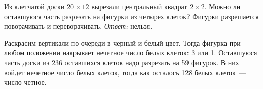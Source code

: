 \problem{}
Из клетчатой доски $20 \times 12$ вырезали центральный квадрат $2 \times 2$.
Можно ли оставшуюся часть разрезать на фигурки
из четырех клеток?
Фигурки разрешается поворачивать и переворачивать.
\solution
\emph{Ответ:} нельзя.
\par
Раскрасим вертикали по очереди в черный и белый цвет.
Тогда фигурка при любом положении накрывает нечетное число белых клеток:
3 или 1.
Оставшуюся часть доски из 236 оставшихся клеток надо разрезать на 59 фигурок.
В них войдет нечетное число белых клеток, тогда как осталось
128 белых клеток~--- число четное.
\endproblem
